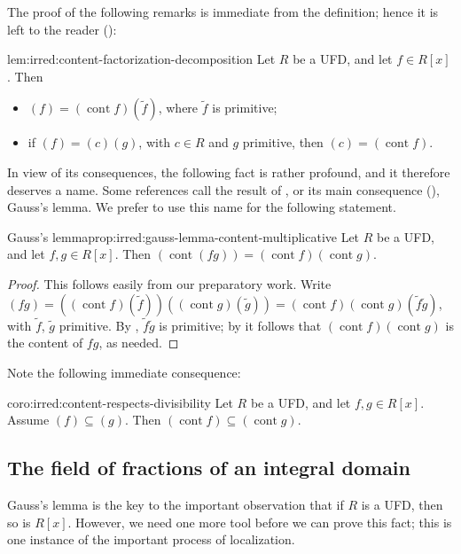 The proof of the following remarks is immediate from the definition;
hence it is left to the reader
():
\begin{lem}{}{lem:irred:content-factorization-decomposition}
  Let $R$ be a UFD, and let $f \in R[x]$. Then
  \begin{itemize}
  \item $(f) = (\operatorname{cont} f)(\tilde{f})$, where $\tilde{f}$
    is primitive;
  \item if $(f) = (c)(g)$, with $c \in R$ and $g$ primitive, then
    $(c) = (\operatorname{cont} f)$.
  \end{itemize}
\end{lem}
In view of its consequences, the following fact is rather profound,
and it therefore deserves a name. Some references call the result of
, or its main consequence (),
Gauss's lemma. We prefer to use this name for the following statement.

\begin{prop}{Gauss's lemma}{prop:irred:gauss-lemma-content-multiplicative}
  Let $R$ be a UFD, and let $f, g \in R[x]$. Then
  $(\operatorname{cont}(fg)) = (\operatorname{cont}
  f)(\operatorname{cont} g)$.
\end{prop}

\begin{proof}
  This follows easily from our preparatory work. Write
  $(fg) = ((\operatorname{cont} f)(\tilde{f}))((\operatorname{cont}
  g)(\tilde{g})) = (\operatorname{cont} f)(\operatorname{cont}
  g)(\tilde{f}\tilde{g})$, with $\tilde{f}$, $\tilde{g}$ primitive. By
  , $\tilde{f}\tilde{g}$ is primitive; by
   it follows that
  $(\operatorname{cont} f)(\operatorname{cont} g)$ is the content of
  $fg$, as needed.
\end{proof}

Note the following immediate consequence:

\begin{coro}{}{coro:irred:content-respects-divisibility}
  Let $R$ be a UFD, and let $f, g \in R[x]$. Assume
  $(f) \subseteq (g)$.  Then
  $(\operatorname{cont} f) \subseteq (\operatorname{cont} g)$.
\end{coro}

\subsection{The field of fractions of an integral domain}
\label{subsec:irred:the-field-of-fractions-of-an-integral-domain}
Gauss's lemma is the key to the important observation that if $R$ is a
UFD, then so is $R[x]$. However, we need one more tool before we can
prove this fact; this is one instance of the important process of
localization.

